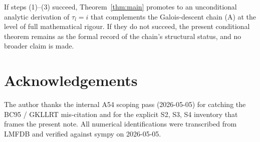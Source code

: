 \documentclass[12pt]{amsart}
\theoremstyle{definition}
\begin{document}
If steps (1)--(3) succeed, Theorem~\ref{thm:main} promotes to an
unconditional analytic derivation of $\tau_l = i$ that complements
the Galois-descent chain (A) at the level of full mathematical
rigour. If they do not succeed, the present conditional theorem
remains as the formal record of the chain's structural status, and
no broader claim is made.

\section*{Acknowledgements}
The author thanks the internal A54 scoping pass (2026-05-05) for
catching the BC95 / GKLLRT mis-citation and for the explicit S2,
S3, S4 inventory that frames the present note. All numerical
identifications were transcribed from LMFDB and verified against
sympy on 2026-05-05.
\end{document}
